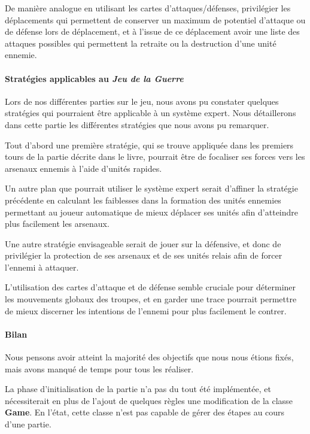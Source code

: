 \documentclass[a4paper]{report}
\begin{document}
De manière analogue en utilisant les cartes d'attaques/défenses, privilégier les déplacements qui permettent de conserver un maximum de potentiel d'attaque ou de défense lors de déplacement, et à l'issue de ce déplacement avoir une liste des attaques possibles qui permettent la retraite ou la destruction d'une unité ennemie.

\paragraph*{Stratégies applicables au \textit{Jeu de la Guerre}}

Lors de nos différentes parties sur le jeu, nous avons pu constater quelques stratégies qui pourraient être applicable à un système expert.
Nous détaillerons dans cette partie les différentes stratégies que nous avons pu remarquer.

Tout d'abord une première stratégie, qui se trouve appliquée dans les premiers tours de la partie décrite dans le livre, pourrait être de focaliser ses forces vers les arsenaux ennemis à l'aide d'unités rapides.

Un autre plan que pourrait utiliser le système expert serait d'affiner la stratégie précédente en calculant les faiblesses dans la formation des unités ennemies permettant au joueur automatique de mieux déplacer ses unités afin d'atteindre plus facilement les arsenaux.

Une autre stratégie envisageable serait de jouer sur la défensive, et donc de privilégier la protection de ses arsenaux et de ses unités relais afin de forcer l'ennemi à attaquer.

L'utilisation des cartes d'attaque et de défense semble cruciale pour déterminer les mouvements globaux des troupes, et en garder une trace pourrait permettre de mieux discerner les intentions de l'ennemi pour plus facilement le contrer.

\paragraph*{Bilan}

Nous pensons avoir atteint la majorité des objectifs que nous nous étions fixés, mais avons manqué de temps pour tous les réaliser.

La phase d'initialisation de la partie n'a pas du tout été implémentée, et nécessiterait en plus de l'ajout de quelques règles une modification de la classe \textbf{Game}. En l'état, cette classe n'est pas capable de gérer des étapes au cours d'une partie.
\end{document}
